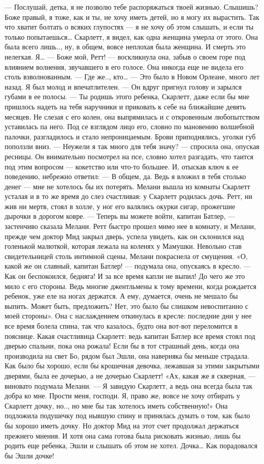 — Послушай, детка, я не позволю тебе распоряжаться твоей жизнью. Слышишь? Боже правый, я тоже, как и ты, не хочу иметь детей, но я могу их вырастить. Так что хватит болтать о всяких глупостях — я не хочу об этом слышать, и если ты только попытаешься… Скарлетт, я видел, как одна женщина умерла от этого. Она была всего лишь.., ну, в общем, вовсе неплохая была женщина. И смерть это нелегкая. Я…
— Боже мой, Ретт! — воскликнула она, забыв о своем горе под влиянием волнения, звучавшего в его голосе. Она никогда еще не видела его столь взволнованным. — Где же.., кто…
— Это было в Новом Орлеане, много лет назад. Я был молод и впечатлителен. — Он вдруг пригнул голову и зарылся губами в ее полосы. — Ты родишь этого ребенка, Скарлетт, даже если бы мне пришлось надеть на тебя наручники и приковать к себе на ближайшие девять месяцев. Не слезая с его колен, она выпрямилась и с откровенным любопытством уставилась па него. Под се взглядом лицо его, словно по мановению волшебной палочки, разгладилось и стало непроницаемым. Брови приподнялись, уголки губ поползли вниз.
— Неужели я так много для тебя значу? — спросила она, опуская ресницы.
Он внимательно посмотрел на псе, словно хотел разгадать, что таится под этим вопросом — кокетство или что-то большее. И, отыскав ключ к ее поведению, небрежно ответил:
— В общем, да. Ведь я вложил в тебя столько денег — мне не хотелось бы их потерять.
Мелани вышла из комнаты Скарлетт усталая и в то же время до слез счастливая: у Скарлетт родилась дочь. Ретт, ни жив ни мертв, стоял в холле, у ног его валялись окурки сигар, прожегшие дырочки в дорогом ковре.
— Теперь вы можете войти, капитан Батлер, — застенчиво сказала Мелани.
Ретт быстро прошел мимо нее в комнату, и Мелани, прежде чем доктор Мид закрыл дверь, успела увидеть, как он склонился над голенькой малюткой, которая лежала на коленях у Мамушки.
Невольно став свидетельницей столь интимной сцены, Мелани покраснела от смущения.
«О, какой же он славный, капитан Батлер! — подумала она, опускаясь в кресло. — Как он беспокоился, бедняга! И за все время капли не выпил! До чего же это мило с его стороны. Ведь многие джентльмены к тому времени, когда рождается ребенок, уже еле на ногах держатся. А ему, думается, очень не мешало бы выпить. Может быть, предложить? Нет, это было бы слишком невоспитанно с моей стороны».
Она с наслаждением откинулась в кресле: последние дни у нее все время болела спина, так что казалось, будто она вот-вот переломится в пояснице. Какая счастливица Скарлетт: ведь капитан Батлер все время стоял под дверью спальни, пока она рожала! Если бы в тот страшный день, когда она производила на свет Бо, рядом был Эшли, она наверняка бы меньше страдала. Как было бы хорошо, если бы крошечная девочка, лежавшая за этими закрытыми дверями, была ее дочерью, а не дочерью Скарлетт! «Ах, какая же я скверная, — виновато подумала Мелани. — Я завидую Скарлетт, а ведь она всегда была так добра ко мне. Прости меня, господи. Я, право же, вовсе не хочу отбирать у Скарлетт дочку, но.., но мне бы так хотелось иметь собственную!» Она подложила подушечку под нывшую спину и принялась думать о том, как было бы хорошо иметь дочку. Но доктор Мид на этот счет продолжал держаться прежнего мнения. И хотя она сама готова была рисковать жизнью, лишь бы родить еще ребенка, Эшли и слышать об этом не хотел. Дочка… Как порадовался бы Эшли дочке!
